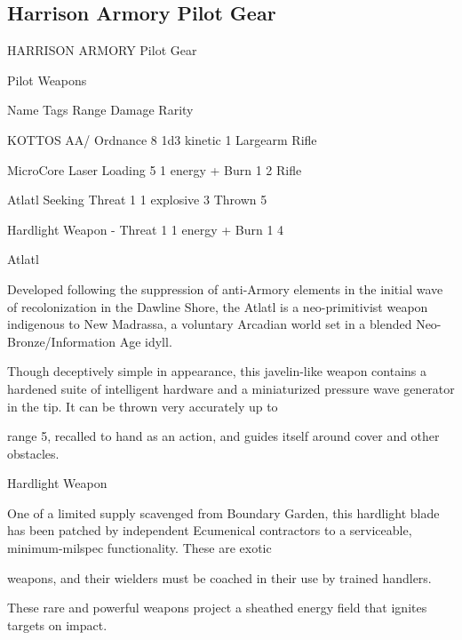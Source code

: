 \subsection{Harrison Armory Pilot Gear}

                                  HARRISON ARMORY Pilot Gear  

                                                    Pilot Weapons  

  Name                    Tags                                      Range            Damage                  Rarity 

 KOTTOS AA/               Ordnance                                  8                1d3 kinetic             1 
 Largearm Rifle 

 MicroCore Laser          Loading                                  5                 1 energy + Burn 1       2 
 Rifle 

 Atlatl                   Seeking                                  Threat 1
         1 explosive             3 
                                                                   Thrown 5 

 Hardlight Weapon         -                                        Threat 1          1 energy + Burn 1       4 

Atlatl  

Developed following the suppression of anti-Armory elements in the initial wave of recolonization in the  
Dawline Shore, the Atlatl is a neo-primitivist weapon indigenous to New Madrassa, a voluntary Arcadian  
world set in a blended Neo-Bronze/Information Age idyll.   

Though deceptively simple in appearance, this javelin-like weapon contains a hardened suite of intelligent  
hardware and a miniaturized pressure wave generator in the tip. It can be thrown very accurately up to  

range 5, recalled to hand as an action, and guides itself around cover and other obstacles.
 

Hardlight Weapon  

One of a limited supply scavenged from Boundary Garden, this hardlight blade has been patched by  
independent Ecumenical contractors to a serviceable, minimum-milspec functionality. These are exotic  

weapons, and their wielders must be coached in their use by trained handlers.    

These rare and powerful weapons project a sheathed energy field that ignites targets on impact.
 

